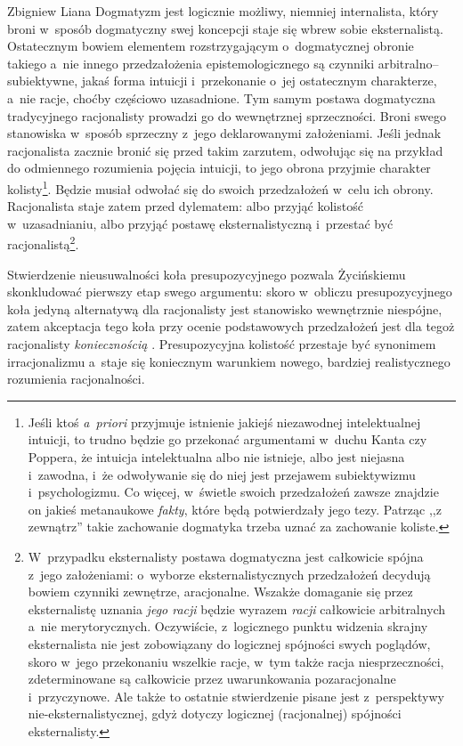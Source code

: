 \begin{artplenv}{Zbigniew Liana}
Dogmatyzm jest logicznie możliwy, niemniej internalista, który broni w~sposób dogmatyczny swej koncepcji staje się wbrew sobie eksternalistą. Ostatecznym bowiem elementem rozstrzygającym o~dogmatycznej obronie takiego a~nie innego przedzałożenia epistemologicznego są czynniki arbitralno–subiektywne, jakaś forma intuicji i~przekonanie o~jej ostatecznym charakterze, a~nie racje, choćby częściowo uzasadnione. Tym samym postawa dogmatyczna tradycyjnego racjonalisty prowadzi go do wewnętrznej sprzeczności. Broni swego stanowiska w~sposób sprzeczny z~jego deklarowanymi założeniami. Jeśli jednak racjonalista zacznie bronić się przed takim zarzutem, odwołując się na przykład do odmiennego rozumienia pojęcia intuicji, to jego obrona przyjmie charakter kolisty\footnote{ Jeśli ktoś \textit{a~priori} przyjmuje istnienie jakiejś niezawodnej intelektualnej intuicji, to trudno będzie go przekonać argumentami w~duchu Kanta czy Poppera, że intuicja intelektualna albo nie istnieje, albo jest niejasna i~zawodna, i~że odwoływanie się do niej jest przejawem subiektywizmu i~psychologizmu. Co więcej, w~świetle swoich przedzałożeń zawsze znajdzie on jakieś metanaukowe \textit{fakty}, które będą potwierdzały jego tezy. Patrząc ,,z zewnątrz'' takie zachowanie dogmatyka trzeba uznać za zachowanie koliste.}. Będzie musiał odwołać się do swoich przedzałożeń w~celu ich obrony. Racjonalista staje zatem przed dylematem: albo przyjąć kolistość w~uzasadnianiu, albo przyjąć postawę eksternalistyczną i~przestać być racjonalistą\footnote{W~przypadku eksternalisty postawa dogmatyczna jest całkowicie spójna z~jego założeniami: o~wyborze eksternalistycznych przedzałożeń decydują bowiem czynniki zewnętrze, aracjonalne. Wszakże domaganie się przez eksternalistę uznania \textit{jego racji} będzie wyrazem \textit{racji} całkowicie arbitralnych a~nie merytorycznych. Oczywiście, z~logicznego punktu widzenia skrajny eksternalista nie jest zobowiązany do logicznej spójności swych poglądów, skoro w~jego przekonaniu wszelkie racje, w~tym także racja niesprzeczności, zdeterminowane są całkowicie przez uwarunkowania pozaracjonalne i~przyczynowe. Ale także to ostatnie stwierdzenie pisane jest z~perspektywy nie-eksternalistycznej, gdyż dotyczy logicznej (racjonalnej) spójności eksternalisty.}.

Stwierdzenie nieusuwalności koła presupozycyjnego pozwala Życińskiemu skonkludować pierwszy etap swego argumentu: skoro w~obliczu presupozycyjnego koła jedyną alternatywą dla racjonalisty jest stanowisko wewnętrznie niespójne, zatem akceptacja tego koła przy ocenie podstawowych przedzałożeń jest dla tegoż racjonalisty \textit{koniecznością}
\parencite[][s.~157]{zycinski_teizm_1985}. %
 Presupozycyjna kolistość przestaje być synonimem irracjonalizmu a~staje się koniecznym warunkiem nowego, bardziej realistycznego rozumienia racjonalności.


\end{artplenv}
